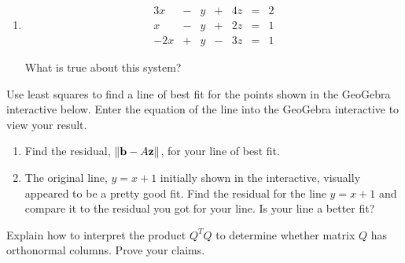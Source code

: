\documentclass{ximera}
\begin{document}
\begin{problem}
\begin{enumerate}
    \item 
    \begin{equation}
\begin{array}{ccccccccc}
      3x &- &y&+&4z&= &2 \\
	 x&-&y&+&2z&=&1\\
     -2x&+&y&-&3z&=&1
    \end{array}
    \end{equation}

    What is true about this system?
    \begin{multipleChoice}
    \end{multipleChoice}

         \end{enumerate}
\end{problem}

\begin{problem}\label{prob_oct_lineFit}
  Use least squares to find a line of best fit for the points shown in the GeoGebra interactive below. 
  Enter the equation of the line into the GeoGebra interactive to view your result.

  \begin{center}
  \end{center}
  
  \begin{enumerate}
    \item Find the residual, $\left\lVert\mathbf{b}-A\mathbf{z}\right\rVert$, for your line of best fit.  
    \item The original line, $y=x+1$ initially shown in the interactive, visually appeared to be a pretty good fit.  Find the residual for the line $y=x+1$ and compare it to the residual you got for your line.  Is your line a better fit?
  \end{enumerate}
\end{problem}

\begin{problem}\label{prob_oct_orth}
  Explain how to interpret the product $Q^TQ$ to determine whether matrix $Q$ has orthonormal columns.  Prove your claims.
\end{problem}
\end{document}
